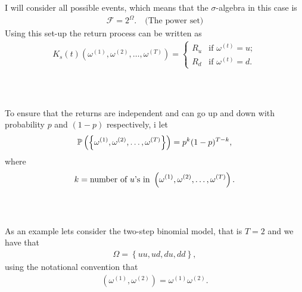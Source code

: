 \documentclass{beamer}
\numberwithin{equation}{section}
\begin{document}
\begin{frame}\frametitle{{\normalsize \secname} \\ {\large \subsecname}}
    I will consider all possible events, which means that the $\sigma$-algebra in this case is
    \begin{align}
        \mathscr{F} = 2^{\Omega}. \quad \text{(The power set)}
    \end{align}
    Using this set-up the return process can be written as
    \begin{align}
        K_s(t)(\omega^{(1)}, \omega^{(2)}, \ldots, \omega^{(T)}) =
        \begin{cases}
            R_u & \text{if } \omega^{(t)} = u; \\
            R_d & \text{if } \omega^{(t)} = d.
        \end{cases}
    \end{align}
\end{frame}

\begin{frame}\frametitle{{\normalsize \secname} \\ {\large \subsecname}}
    To ensure that the returns are independent and can go up and down with probability $p$ and $(1-p)$ respectively, i let
    \begin{align}
        \mathbb{P}\left(
            \left\{
                \omega^{(1)}, \omega^{(2)}, \ldots, \omega^{{\color{black}(T)}}
            \right\}
        \right) =
        p^k(1 - p)^{T-k},
    \end{align}
    where
    \begin{align}
        k = \text{number of $u$'s in } \left(\omega^{(1)}, \omega^{(2)}, \ldots, \omega^{{\color{black}(T)}}\right).
    \end{align}
\end{frame}

\begin{frame}\frametitle{{\normalsize \secname} \\ {\large \subsecname}}
    As an example lets consider the two-step binomial model, that is $T = 2$ and we have that
    \begin{align}
        \Omega = \left\{ uu, ud, du, dd \right\},
    \end{align}
    using the notational convention that
    \begin{align}
        \left(
            \omega^{(1)}, \omega^{(2)}
        \right)
        =
        \omega^{(1)}\omega^{(2)}.
    \end{align}
\end{frame}
\end{document}
